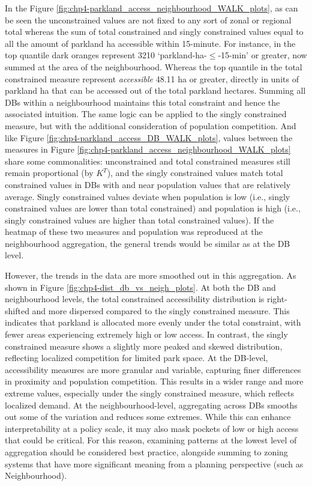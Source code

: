 \documentclass[
11pt, %
oneside, %
english, %
singlespacing, %
]{macthesis} %
\begin{document}
In the Figure \ref{fig:chp4-parkland_access_neighbourhood_WALK_plots}, as can be seen the unconstrained values are not fixed to any sort of zonal or regional total whereas the sum of total constrained and singly constrained values equal to all the amount of parkland ha accessible within 15-minute. For instance, in the top quantile dark oranges represent 3210 `parkland-ha-\(\le\)-15-min' or greater, now summed at the area of the neighbourhood. Whereas the top quantile in the total constrained measure represent \emph{accessible} 48.11 ha or greater, directly in units of parkland ha that can be accessed out of the total parkland hectares. Summing all DBs within a neighbourhood maintains this total constraint and hence the associated intuition. The same logic can be applied to the singly constrained measure, but with the additional consideration of population competition. And like Figure \ref{fig:chp4-parkland_access_DB_WALK_plots}, values between the measures in Figure \ref{fig:chp4-parkland_access_neighbourhood_WALK_plots} share some commonalities: unconstrained and total constrained measures still remain proportional (by \(K^T\)), and the singly constrained values match total constrained values in DBs with and near population values that are relatively average. Singly constrained values deviate when population is low (i.e., singly constrained values are lower than total constrained) and population is high (i.e., singly constrained values are higher than total constrained values). If the heatmap of these two measures and population was reproduced at the neighbourhood aggregation, the general trends would be similar as at the DB level.

However, the trends in the data are more smoothed out in this aggregation. As shown in Figure \ref{fig:chp4-dist_db_vs_neigh_plots}. At both the DB and neighbourhood levels, the total constrained accessibility distribution is right-shifted and more dispersed compared to the singly constrained measure. This indicates that parkland is allocated more evenly under the total constraint, with fewer areas experiencing extremely high or low access. In contrast, the singly constrained measure shows a slightly more peaked and skewed distribution, reflecting localized competition for limited park space. At the DB-level, accessibility measures are more granular and variable, capturing finer differences in proximity and population competition. This results in a wider range and more extreme values, especially under the singly constrained measure, which reflects localized demand. At the neighbourhood-level, aggregating across DBs smooths out some of the variation and reduces some extremes. While this can enhance interpretability at a policy scale, it may also mask pockets of low or high access that could be critical. For this reason, examining patterns at the lowest level of aggregation should be considered best practice, alongside summing to zoning systems that have more significant meaning from a planning perspective (such as Neighbourhood).
\end{document}
